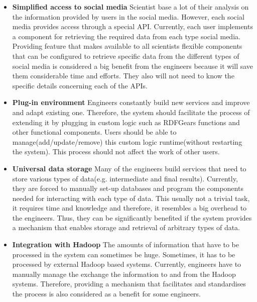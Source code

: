 \begin{itemize}

\item \textbf{Simplified access to social media}
Scientist base a lot of their analysis on the information provided by users in the social media. However, each social media provides access through a special API. Currently, each user implements a component for retrieving the required data from each type social media. Providing feature that makes available to all scientists flexible components that can be configured to retrieve specific data from the different types of social media is considered a big benefit from the engineers because it will save them considerable time and efforts. They also will not need to know the specific details concerning each of the APIs. 

\item \textbf{Plug-in environment}
Engineers constantly build new services and improve and adapt existing one. Therefore, the system should facilitate the process of extending it by plugging in custom logic such as RDFGears functions and other functional components. Users should be able to manage(add/update/remove) this custom logic runtime(without restarting the system). This process should not affect the work of other users.

\item \textbf{Universal data storage} 
Many of the engineers build services that need to store various types of data(e.g. intermediate and final results). Currently, they are forced to manually set-up databases and program the components needed for interacting with each type of data. This usually not a trivial task, it requires time and knowledge and therefore, it resembles a big overhead to the engineers. Thus, they can be significantly benefited if the system provides a mechanism that enables storage and retrieval of arbitrary types of data.

 
\item \textbf{Integration with Hadoop}
The amounts of information that have to be processed in the system can sometimes be huge. Sometimes, it has to be processed by external Hadoop based systems. Currently, engineers have to manually manage the exchange the information to and from the Hadoop systems. Therefore, providing a mechanism that facilitates and standardises the process is also considered as a benefit for some engineers.

\end{itemize}

